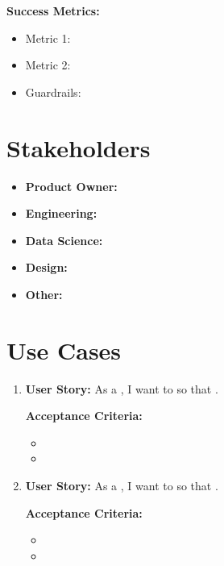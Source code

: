 \documentclass[11pt]{article}
\begin{document}

\textbf{Success Metrics:}
\begin{itemize}[leftmargin=*]
    \item Metric 1:
    \item Metric 2:
    \item Guardrails:
\end{itemize}

\section{Stakeholders}
\begin{itemize}[leftmargin=*]
    \item \textbf{Product Owner:}
    \item \textbf{Engineering:}
    \item \textbf{Data Science:}
    \item \textbf{Design:}
    \item \textbf{Other:}
\end{itemize}

\section{Use Cases}
\begin{enumerate}[leftmargin=*]
    \item \textbf{User Story:} As a \underline{\hspace{2cm}}, I want to \underline{\hspace{4cm}} so that \underline{\hspace{4cm}}.
    
    \textbf{Acceptance Criteria:}
    \begin{itemize}
        \item 
        \item 
    \end{itemize}

    \item \textbf{User Story:} As a \underline{\hspace{2cm}}, I want to \underline{\hspace{4cm}} so that \underline{\hspace{4cm}}.
    
    \textbf{Acceptance Criteria:}
    \begin{itemize}
        \item 
        \item 
    \end{itemize}
\end{enumerate}
\end{document}
